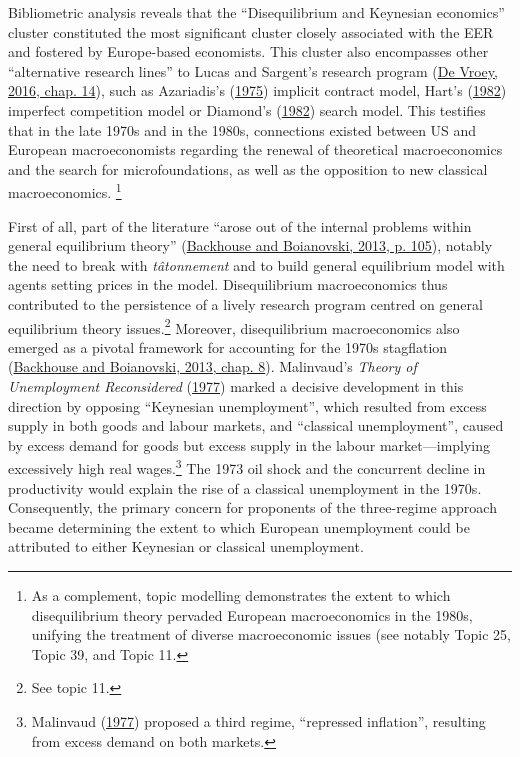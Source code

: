 \documentclass[
  12pt,
  onecolumn]{article}
\begin{document}
Bibliometric analysis reveals that the ``Disequilibrium and Keynesian
economics'' cluster constituted the most significant cluster closely
associated with the EER and fostered by Europe-based economists. This
cluster also encompasses other ``alternative research lines'' to Lucas
and Sargent's research program (\protect\hyperlink{ref-devroey2016}{De
Vroey, 2016, chap. 14}), such as Azariadis's
(\protect\hyperlink{ref-azariadis1975}{1975}) implicit contract model,
Hart's (\protect\hyperlink{ref-hart1982}{1982}) imperfect competition
model or Diamond's (\protect\hyperlink{ref-diamond1982}{1982}) search
model. This testifies that in the late 1970s and in the 1980s,
connections existed between US and European macroeconomists regarding
the renewal of theoretical macroeconomics and the search for
microfoundations, as well as the opposition to new classical
macroeconomics. \footnote{As a complement, topic modelling demonstrates
  the extent to which disequilibrium theory pervaded European
  macroeconomics in the 1980s, unifying the treatment of diverse
  macroeconomic issues (see notably Topic 25, Topic 39, and Topic 11.}

First of all, part of the literature ``arose out of the internal
problems within general equilibrium theory''
(\protect\hyperlink{ref-backhouseboianovski2013}{Backhouse and
Boianovski, 2013, p. 105}), notably the need to break with
\emph{tâtonnement} and to build general equilibrium model with agents
setting prices in the model. Disequilibrium macroeconomics thus
contributed to the persistence of a lively research program centred on
general equilibrium theory issues.\footnote{See topic 11.} Moreover,
disequilibrium macroeconomics also emerged as a pivotal framework for
accounting for the 1970s stagflation
(\protect\hyperlink{ref-backhouseboianovski2013}{Backhouse and
Boianovski, 2013, chap. 8}). Malinvaud's \emph{Theory of Unemployment
Reconsidered} (\protect\hyperlink{ref-malinvaud1977}{1977}) marked a
decisive development in this direction by opposing ``Keynesian
unemployment'', which resulted from excess supply in both goods and
labour markets, and ``classical unemployment'', caused by excess demand
for goods but excess supply in the labour market---implying excessively
high real wages.\footnote{Malinvaud
  (\protect\hyperlink{ref-malinvaud1977}{1977}) proposed a third regime,
  ``repressed inflation'', resulting from excess demand on both markets.}
The 1973 oil shock and the concurrent decline in productivity would
explain the rise of a classical unemployment in the 1970s. Consequently,
the primary concern for proponents of the three-regime approach became
determining the extent to which European unemployment could be
attributed to either Keynesian or classical unemployment.
\end{document}
